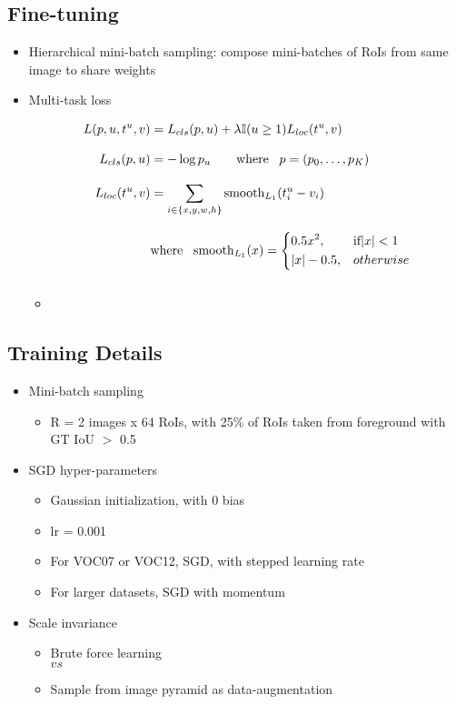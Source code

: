 \subsection*{Fine-tuning}
\begin{itemize}
\item Hierarchical mini-batch sampling: compose mini-batches of RoIs from same image to share weights
\item Multi-task loss

\begin{equation*}
\begin{split}
L(p, u, t^u, v) &= L_{cls}(p, u) + \lambda \mathbb{I}(u \ge 1) L_{loc}(t^u, v)\\[3mm]
L_{cls}(p, u) &= -\log p_u \hspace{2em} \text{where} \;\;\;p = (p_0, \dots , p_K)\\[3mm]
L_{loc}(t^u, v) &= \sum\limits_{i \in \{ x,y,w,h \} } \text{smooth}_{L_1}(t_i^u - v_i)\\[3mm]
& \text{where} \;\;\; \text{smooth}_{L_1}(x) = 
	\begin{dcases}
	0.5x^2, & \text{if} |x| < 1\\
	|x| - 0.5, & otherwise
	\end{dcases}\\[3mm]
\end{split}
\end{equation*}

	\begin{itemize}
	\item 
	\end{itemize}
\end{itemize}

\subsection*{Training Details}
\begin{itemize}
\item Mini-batch sampling
	\begin{itemize}
	\item R = 2 images x 64 RoIs, with 25\% of RoIs taken from foreground with GT IoU $>$ 0.5 
	\end{itemize}

\item SGD hyper-parameters
	\begin{itemize}
	\item Gaussian initialization, with 0 bias
	\item lr = 0.001
	\item For VOC07 or VOC12, SGD, with stepped learning rate
	\item For larger datasets, SGD with momentum
	\end{itemize}
	
\item Scale invariance
	\begin{itemize}
	\item Brute force learning \\$vs$
	\item Sample from image pyramid as data-augmentation
	\end{itemize}
\end{itemize}

